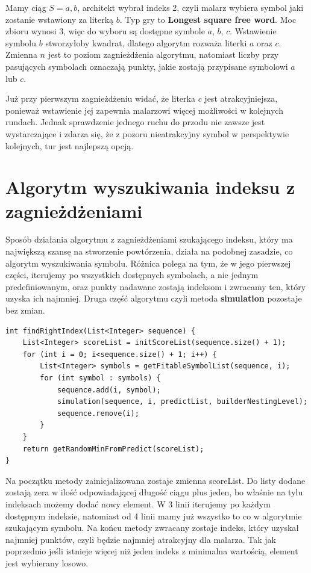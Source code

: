 \documentclass[document]{xmgr}
\begin{document}
Mamy ciąg $S = a, b$, architekt wybrał indeks 2, czyli malarz wybiera symbol jaki zostanie wstawiony za literką $b$. Typ gry to \textbf{Longest square free word}. Moc zbioru wynosi 3, więc do wyboru są dostępne symbole $a$, $b$, $c$. Wstawienie symbolu $b$ stworzyłoby kwadrat, dlatego algorytm rozważa literki $a$ oraz $c$. Zmienna $n$ jest to poziom zagnieżdżenia algorytmu, natomiast liczby przy pasujących symbolach oznaczają punkty, jakie zostają przypisane symbolowi $a$ lub $c$. 

Już przy pierwszym zagnieżdżeniu widać, że literka $c$ jest atrakcyjniejsza, ponieważ wstawienie jej zapewnia malarzowi więcej możliwości w kolejnych rundach. Jednak sprawdzenie jednego ruchu do przodu nie zawsze jest wystarczające i zdarza się, że z pozoru nieatrakcyjny symbol w perspektywie kolejnych, tur jest najlepszą opcją.

\section{Algorytm wyszukiwania indeksu z zagnieżdżeniami}
Sposób działania algorytmu z zagnieżdżeniami szukającego indeksu, który ma największą szansę na stworzenie powtórzenia, działa na podobnej zasadzie, co algorytm wyszukiwania symbolu. Różnica polega na tym, że w jego pierwszej części, iterujemy po wszystkich dostępnych symbolach, a nie jednym predefiniowanym, oraz punkty nadawane zostają indeksom i zwracamy ten, który uzyska ich najmniej. Druga część algorytmu czyli metoda \textbf{simulation} pozostaje bez zmian.

\begin{lstlisting}[frame=single]
int findRightIndex(List<Integer> sequence) {
	List<Integer> scoreList = initScoreList(sequence.size() + 1);
	for (int i = 0; i<sequence.size() + 1; i++) {
		List<Integer> symbols = getFitableSymbolList(sequence, i);
		for (int symbol : symbols) {
			sequence.add(i, symbol);
			simulation(sequence, i, predictList, builderNestingLevel);
			sequence.remove(i);
		}
	}
	return getRandomMinFromPredict(scoreList);
}
\end{lstlisting}

Na początku metody zainicjalizowana zostaje zmienna scoreList. Do listy dodane zostają zera w ilość odpowiadającej długość ciągu plus jeden, bo właśnie na tylu indeksach możemy dodać nowy element. W 3 linii iterujemy po każdym dostępnym indeksie, natomiast od 4 linii mamy już wszystko to co w algorytmie szukającym symbolu. Na końcu metody zwracany zostaje indeks, który uzyskał najmniej punktów, czyli będzie najmniej atrakcyjny dla malarza. Tak jak poprzednio jeśli istnieje więcej niż jeden indeks z minimalna wartością, element jest wybierany losowo.
\end{document}
